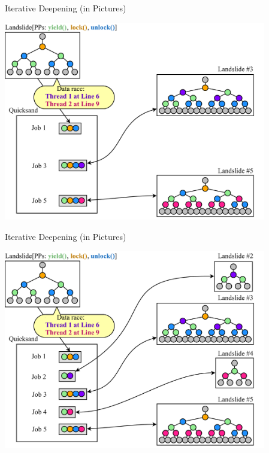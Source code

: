 \documentclass[xcolor=dvipsnames]{beamer}
\begin{document}
\begin{frame}{Iterative Deepening (in Pictures)}
	\begin{center}
	\vspace{-0.88em}
	\includegraphics[width=0.86\textwidth]{../../oopsla/dr-jobs-3.pdf}
	\end{center}
\end{frame}
\begin{frame}{Iterative Deepening (in Pictures)}
	\begin{center}
	\vspace{-0.88em}
	\includegraphics[width=0.86\textwidth]{../../oopsla/dr-jobs-4.pdf}
	\end{center}
\end{frame}

\end{document}
